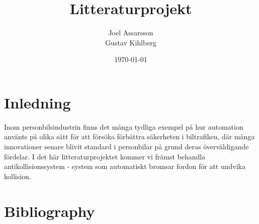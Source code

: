 \documentclass[a4paper]{article}
\begin{document}
\title{Litteraturprojekt}
\author{
\begin{tabular}[t]{c}
\large Joel Assarsson\\Gustav Kihlberg\\
\date{\today}
\end{tabular}
}
\maketitle

\newpage
\section{Inledning}
Inom personbilsindustrin finns det många tydliga exempel på hur automation använts på olika sätt för att försöka förbättra säkerheten i biltrafiken, där många innovationer senare blivit standard i personbilar på grund deras överväldigande fördelar. I det här litteraturprojektet kommer vi främst behandla antikollisionssystem - system som automatiskt bromsar fordon för att undvika kollision. 

\newpage
\section{Bibliography}
 
% 
{}
\end{document}
